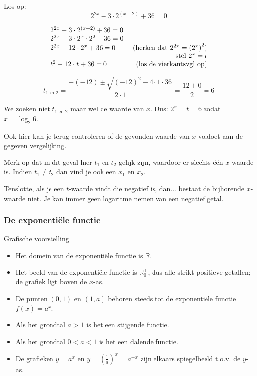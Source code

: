 \begin{voorbeeld}
Los op:  \begin{equation*}
2^{2x}-3\cdot 2^{(x+2)}+36=0
\end{equation*}

\begin{equation*}
 \begin{array}{lr}
 2^{2x}-3\cdot 2^{(x+2)}+36 = 0 & \\
	 2^{2x}-3\cdot 2^{x}\cdot 2^{2}+36 = 0 & \\
	 2^{2x}-12\cdot 2^{x}+36 = 0 & \text{ (herken dat \ensuremath{ 2^{2x}=\left(2^{x}\right)^{2}}}) \\
 	 & \text{ stel }2^{x}=t\\
	 t^{2}-12\cdot t+36 = 0 & \text{ (los de vierkantsvgl op)}
	\end{array}
\end{equation*}

\begin{equation*}
t_{1\textrm{ en }2}=\frac{-(-12)\pm\sqrt{(-12)^{2}-4\cdot 1\cdot 36}}{2\cdot 1}=\frac{12\pm0}{2}=6
\end{equation*}

We zoeken niet $ t_{1\textrm{ en }2}$ maar wel de waarde van $x$. Dus: $ 2^{x}=t=6$ zodat $ x=\log_{2}6$.

Ook hier kan je terug controleren of de gevonden waarde van $x$ voldoet
aan de gegeven vergelijking. 

Merk op dat in dit geval hier $ t_{1}$ en $ t_{2}$ gelijk zijn, waardoor er slechts \'e\'en $x$-waarde is. Indien $ t_{1}\neq t_{2}$ dan vind je ook een $x_{1}$ en $ x_{2}$.

Tenslotte, als je een $t$-waarde vindt die negatief is, dan... bestaat
de bijhorende $x$-waarde niet. Je kan immer geen logaritme nemen
van een negatief getal.

\end{voorbeeld}

\subsubsection{De exponenti\"ele functie}

Grafische voorstelling
\begin{itemize}
	\item Het domein van de exponenti\"ele functie is $\mathbb{R}$.
	\item Het beeld van de exponenti\"ele functie is ${\displaystyle \mathbb{R}}_{0}^{+}$,
	dus alle strikt positieve getallen; de grafiek ligt boven de $x$-as.
	\item De punten $(0,1)$ en $(1,a)$ behoren steeds tot de exponenti\"ele
	functie ${\displaystyle f(x)=a^{x}}$.
	\item Als het grondtal $a>1$ is het een stijgende functie.
	\item Als het grondtal $0<a<1$ is het een dalende functie.
	\item De grafieken ${\displaystyle y=a^{x}}$ en ${\displaystyle y=\left(\frac{1}{a}\right)^{x}=a^{-x}}$
	zijn elkaars spiegelbeeld t.o.v. de $y$-as.
\end{itemize}

